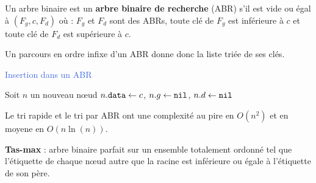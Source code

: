 \documentclass[a4paper,10pt,twocolumn]{article}
\begin{document}
	\begin{defn}
	Un arbre binaire est un \textbf{arbre binaire de recherche} (ABR) s'il est vide ou égal à $(F_g,c,F_d)$ où : $F_g$ et $F_d$ sont des ABRs, toute clé de $F_g$ est inférieure à $c$ et toute clé de $F_d$ est supérieure à $c$.
	\end{defn}

	Un parcours en ordre infixe d'un ABR donne donc la liste triée de ses clés.

	\begin{algorithm}[h]
	\caption{\textcolor{RoyalBlue}{Insertion dans un ABR}}
	{
		{
			Soit $n$ un nouveau nœud \;
			$n.\texttt{data} \leftarrow c$, $n.g \leftarrow \texttt{nil}$, $n.d \leftarrow \texttt{nil}$ \;
		}
		\Sinon
		{
		}
	}
	\end{algorithm}

	\begin{pop}
	Le tri rapide et le tri par ABR ont une complexité au pire en $O \left( n^2 \right)$ et en moyene en $O(n\ln(n))$.
	\end{pop}

	\begin{defn}
	\textbf{Tas-max} : arbre binaire parfait sur un ensemble totalement ordonné tel que l'étiquette de chaque nœud autre que la racine est inférieure ou égale à l'étiquette de son père.
	\end{defn}
\end{document}
